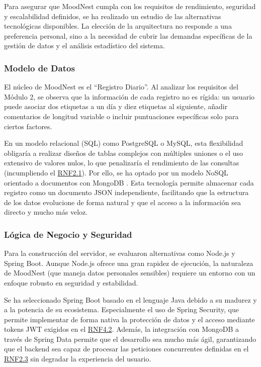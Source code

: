 Para asegurar que MoodNest cumpla con los requisitos de rendimiento, seguridad y escalabilidad definidos, se ha realizado un estudio de las alternativas tecnológicas disponibles. La elección de la arquitectura no responde a una preferencia personal, sino a la necesidad de cubrir las demandas específicas de la gestión de datos y el análisis estadístico del sistema.

\subsubsection{Modelo de Datos}
El núcleo de MoodNest es el ``Registro Diario''. Al analizar los requisitos del Módulo 2, se observa que la información de cada registro no es rígida: un usuario puede asociar dos etiquetas a un día y diez etiquetas al siguiente, añadir comentarios de longitud variable o incluir puntuaciones específicas solo para ciertos factores.

En un modelo relacional (SQL) como PostgreSQL o MySQL, esta flexibilidad obligaría a realizar diseños de tablas complejos con múltiples uniones o el uso extensivo de valores nulos, lo que penalizaría el rendimiento de las consultas (incumpliendo el \hyperref[tab:rnf_total]{RNF2.1}). Por ello, se ha optado por un modelo NoSQL orientado a documentos con MongoDB \cite{bib:mongodb}. Esta tecnología permite almacenar cada registro como un documento JSON \cite{bib:json} independiente, facilitando que la estructura de los datos evolucione de forma natural y que el acceso a la información sea directo y mucho más veloz.

\subsubsection{Lógica de Negocio y Seguridad}
Para la construcción del servidor, se evaluaron alternativas como Node.js y Spring Boot. Aunque Node.js ofrece una gran rapidez de ejecución, la naturaleza de MoodNest (que maneja datos personales sensibles) requiere un entorno con un enfoque robusto en seguridad y estabilidad.

Se ha seleccionado Spring Boot \cite{bib:springboot} basado en el lenguaje Java \cite{bib:java} debido a su madurez y a la potencia de su ecosistema. Especialmente el uso de Spring Security, que permite implementar de forma nativa la protección de datos y el acceso mediante tokens JWT exigidos en el \hyperref[tab:rnf_total]{RNF4.2}. Además, la integración con MongoDB a través de Spring Data permite que el desarrollo sea mucho más ágil, garantizando que el backend sea capaz de procesar las peticiones concurrentes definidas en el \hyperref[tab:rnf_total]{RNF2.3} sin degradar la experiencia del usuario.

